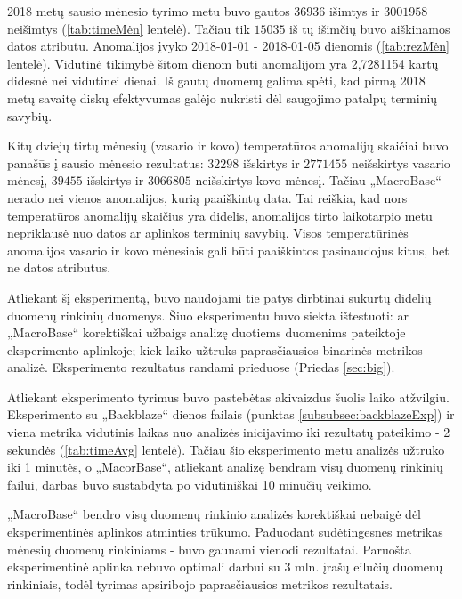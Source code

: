 \documentclass{VUMIFPSkursinis}
\begin{document}
2018 metų sausio mėnesio tyrimo metu buvo gautos $36 936$ išimtys ir $3 001 958$ neišimtys (\ref{tab:timeMėn} lentelė). Tačiau tik $15 035$ iš tų išimčių buvo aiškinamos datos atributu. Anomalijos įvyko 2018-01-01 - 2018-01-05 dienomis (\ref{tab:rezMėn} lentelė). Vidutinė tikimybė šitom dienom būti anomalijom yra 2,7281154 kartų didesnė nei vidutinei dienai. Iš gautų duomenų galima spėti, kad pirmą 2018 metų savaitę diskų efektyvumas galėjo nukristi dėl saugojimo patalpų terminių savybių.\par

Kitų dviejų tirtų mėnesių (vasario ir kovo) temperatūros anomalijų skaičiai buvo panašūs į sausio mėnesio rezultatus: $32 298$ išskirtys ir $2 771 455$ neišskirtys vasario mėnesį, $39 455$ išskirtys ir $3 066 805$ neišskirtys kovo mėnesį. Tačiau „MacroBase“ nerado nei vienos anomalijos, kurią paaiškintų data. Tai reiškia, kad nors temperatūros anomalijų skaičius yra didelis, anomalijos tirto laikotarpio metu nepriklausė nuo datos ar aplinkos terminių savybių. Visos temperatūrinės anomalijos vasario ir kovo mėnesiais gali būti paaiškintos pasinaudojus kitus, bet ne datos atributus.

 \label{subsubsubsec:dideli}
Atliekant šį eksperimentą, buvo naudojami tie patys dirbtinai sukurtų didelių duomenų rinkinių duomenys. Šiuo eksperimentu buvo siekta ištestuoti: ar „MacroBase“ korektiškai užbaigs analizę duotiems duomenims pateiktoje eksperimento aplinkoje; kiek laiko užtruks paprasčiausios binarinės metrikos analizė. Eksperimento rezultatus randami prieduose (Priedas \ref{sec:big}).\par

Atliekant eksperimento tyrimus buvo pastebėtas akivaizdus šuolis laiko atžvilgiu. Eksperimento su „Backblaze“ dienos failais (punktas \ref{subsubsec:backblazeExp}) ir viena metrika vidutinis laikas nuo analizės inicijavimo iki rezultatų pateikimo - 2 sekundės (\ref{tab:timeAvg} lentelė). Tačiau šio eksperimento metu analizės užtruko iki 1 minutės, o „MacorBase“, atliekant analizę bendram visų duomenų rinkinių failui, darbas buvo sustabdyta po vidutiniškai 10 minučių veikimo. \par
„MacroBase“ bendro visų duomenų rinkinio analizės korektiškai nebaigė dėl eksperimentinės aplinkos atminties trūkumo. Paduodant sudėtingesnes metrikas mėnesių duomenų rinkiniams - buvo gaunami vienodi rezultatai. Paruošta eksperimentinė aplinka nebuvo optimali darbui su 3 mln. įrašų eilučių duomenų rinkiniais, todėl tyrimas apsiribojo paprasčiausios metrikos rezultatais.
\end{document}
